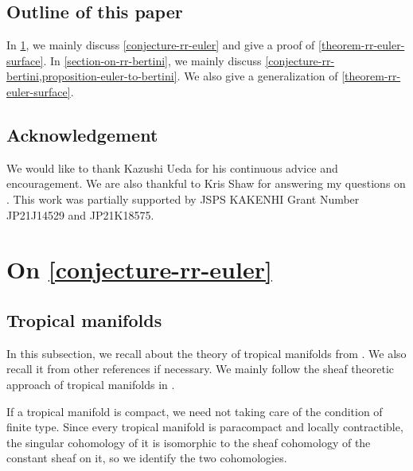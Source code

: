 \documentclass[a4paper,dvipdfmx,reqno,12pt]{amsart}
\theoremstyle{definition}
\numberwithin{equation}{section}
\begin{document}
\subsection{Outline of this paper}
In \cref{section-on-rr-euler}, we mainly
discuss \cref{conjecture-rr-euler} and
give a proof of \cref{theorem-rr-euler-surface}.
In \cref{section-on-rr-bertini}, we mainly
discuss \cref{conjecture-rr-bertini,proposition-euler-to-bertini}.
We also give a generalization of
\cref{theorem-rr-euler-surface}.

\subsection*{Acknowledgement}
We would like to thank Kazushi Ueda for his continuous advice
and encouragement. We are also thankful to Kris Shaw
for answering my questions on
\cite{shaw2015tropical,demedrano2023chern}.
This work was partially supported 
by JSPS KAKENHI Grant Number JP21J14529 and JP21K18575.

\section{On \cref{conjecture-rr-euler}}
\label{section-on-rr-euler}
\subsection{Tropical manifolds}
In this subsection, we recall about 
the theory of tropical manifolds from
\cite{shaw2011tropical,MR3330789,mikhalkin2018tropical,MR4637248,demedrano2023chern}.
We also recall it from other references if necessary.
We mainly follow the sheaf theoretic approach of
tropical manifolds in \cite{MR4637248}.

If a tropical manifold is compact, we need not
taking care of the condition of finite type. 
Since every tropical manifold is paracompact and
locally contractible, the singular cohomology
of it is isomorphic to the sheaf cohomology
of the constant sheaf on it, so we identify
the two cohomologies.
\end{document}
